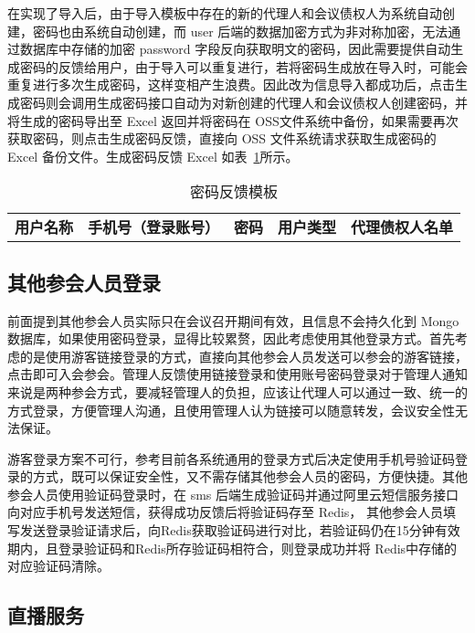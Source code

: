在实现了导入后，由于导入模板中存在的新的代理人和会议债权人为系统自动创建，密码也由系统自动创建，而 user 后端的数据加密方式为非对称加密，无法通过数据库中存储的加密 password 字段反向获取明文的密码，因此需要提供自动生成密码的反馈给用户，由于导入可以重复进行，若将密码生成放在导入时，可能会重复进行多次生成密码，这样变相产生浪费。因此改为信息导入都成功后，点击生成密码则会调用生成密码接口自动为对新创建的代理人和会议债权人创建密码，并将生成的密码导出至 Excel 返回并将密码在 OSS文件系统中备份，如果需要再次获取密码，则点击生成密码反馈，直接向 OSS 文件系统请求获取生成密码的 Excel 备份文件。生成密码反馈 Excel 如表~\ref{fig:passwordReturn}所示。

\begin{table}[h!]
    \begin{center}
      \caption{密码反馈模板}
      \label{fig:passwordReturn}
      \begin{tabular}{|c|c|c|c|c|}
       \textbf{用户名称} & \textbf{手机号（登录账号）} & \textbf{密码} & \textbf{用户类型} & \textbf{代理债权人名单}
      \end{tabular}
    \end{center}
  \end{table}

  \subsection{其他参会人员登录}
  前面提到其他参会人员实际只在会议召开期间有效，且信息不会持久化到 Mongo 数据库，如果使用密码登录，显得比较累赘，因此考虑使用其他登录方式。首先考虑的是使用游客链接登录的方式，直接向其他参会人员发送可以参会的游客链接，点击即可入会参会。管理人反馈使用链接登录和使用账号密码登录对于管理人通知来说是两种参会方式，要减轻管理人的负担，应该让代理人可以通过一致、统一的方式登录，方便管理人沟通，且使用管理人认为链接可以随意转发，会议安全性无法保证。

  游客登录方案不可行，参考目前各系统通用的登录方式后决定使用手机号验证码登录的方式，既可以保证安全性，又不需存储其他参会人员的密码，方便快捷。其他参会人员使用验证码登录时，在 sms 后端生成验证码并通过阿里云短信服务接口向对应手机号发送短信，获得成功反馈后将验证码存至 Redis， 其他参会人员填写发送登录验证请求后，向Redis获取验证码进行对比，若验证码仍在15分钟有效期内，且登录验证码和Redis所存验证码相符合，则登录成功并将 Redis中存储的对应验证码清除。

  \subsection{直播服务}

